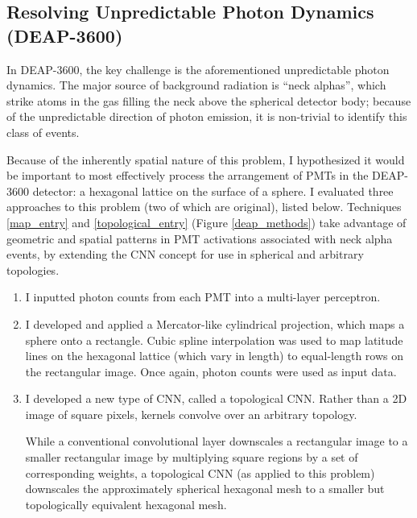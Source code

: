 \documentclass[12pt]{article}
\begin{document}
\subsection{Resolving Unpredictable Photon Dynamics (DEAP-3600)}

In DEAP-3600, the key challenge is the aforementioned unpredictable photon dynamics. The major source of background radiation is ``neck alphas'', which strike atoms in the gas filling the neck above the spherical detector body; because of the unpredictable direction of photon emission, it is non-trivial to identify this class of events.

Because of the inherently spatial nature of this problem, I hypothesized it would be important to most effectively process the arrangement of PMTs in the DEAP-3600 detector: a hexagonal lattice on the surface of a sphere. I evaluated three approaches to this problem (two of which are original), listed below. Techniques \ref{map_entry} and \ref{topological_entry} (Figure \ref{deap_methods}) take advantage of geometric and spatial patterns in PMT activations associated with neck alpha events, by extending the CNN concept for use in spherical and arbitrary topologies.

\begin{enumerate}
    \item I inputted photon counts from each PMT into a multi-layer perceptron.

    \item I developed and applied a Mercator-like cylindrical projection, which maps a sphere onto a rectangle. Cubic spline interpolation was used to map latitude lines on the hexagonal lattice (which vary in length) to equal-length rows on the rectangular image. Once again, photon counts were used as input data. \label{map_entry}

    \item I developed a new type of CNN, called a topological CNN. Rather than a 2D image of square pixels, kernels convolve over an arbitrary topology. \label{topological_entry}
    
    While a conventional convolutional layer downscales a rectangular image to a smaller rectangular image by multiplying square regions by a set of corresponding weights, a topological CNN (as applied to this problem) downscales the approximately spherical hexagonal mesh to a smaller but topologically equivalent hexagonal mesh.
\end{enumerate}
\end{document}
